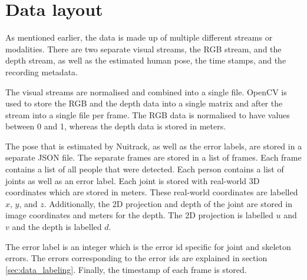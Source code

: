 \section{Data layout}

As mentioned earlier, the data is made up of multiple different streams or modalities. There are two separate visual streams, the RGB stream, and the depth stream, as well as the estimated human pose, the time stamps, and the recording metadata.

The visual streams are normalised and combined into a single file. OpenCV is used to store the RGB and the depth data into a single matrix and after the stream into a single file per frame. The RGB data is normalised to have values between 0 and 1, whereas the depth data is stored in meters.

The pose that is estimated by Nuitrack, as well as the error labels, are stored in a separate JSON file. The separate frames are stored in a list of frames. Each frame contains a list of all people that were detected. Each person contains a list of joints as well as an error label. Each joint is stored with real-world 3D coordinates which are stored in meters. These real-world coordinates are labelled $x$, $y$, and $z$. Additionally, the 2D projection and depth of the joint are stored in image coordinates and meters for the depth. The 2D projection is labelled $u$ and $v$ and the depth is labelled $d$. 

The error label is an integer which is the error id specific for joint and skeleton errors. The errors corresponding to the error ids are explained in section \ref{sec:data_labeling}. Finally, the timestamp of each frame is stored.
